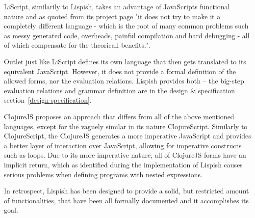 LiScript, similarily to Lispish, takes an advantage of JavaScripts functional nature and as quoted from its project page "it does not try to make it a completely different language - which is the root of many common problems such as messy generated code, overheads, painful compilation and hard debugging - all of which compensate for the theoricall benefits."\cite{LiScript:2013:Site}.

Outlet just like LiScript defines its own language that then gets translated to its equivalent JavaScript. However, it does not provide a formal definition of the allowed forms, nor the evaluation relations. Lispish provides both -- the big-step evaluation relations and grammar definition are in the design \& specification section~\ref{design-specification}.

ClojureJS proposes an approach that differs from all of the above mentioned languages, except for the vaguely similar in its nature ClojureScript. Similarly to ClojureScript, the ClojureJS generates a more imperative JavaScript and provides a better layer of interaction over JavaScript, allowing for imperative constructs such as loops. 
Due to its more imperative nature, all of ClojureJS forms have an implicit return, which as identified during the implementation of Lispish causes serious problems when defining programs with nested expressions. 


In retrospect, Lispish has been designed to provide a solid, but restricted amount of functionalities, that have been all formally documented and it accomplishes its goal.



